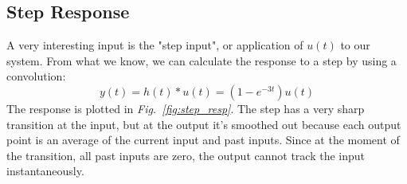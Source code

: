 \subsection{Step Response}
A very interesting input is the "step input", or application of $u(t)$ to our system.  From what we know, we can calculate the response to a step by using a convolution:
    \begin{equation}
        y(t) = h(t) * u(t) = \left( 1 - e^{-3 t} \right) u(t) 
    \end{equation}
The response is plotted in \emph{Fig.~\ref{fig:step_resp}}. The step has a very sharp transition at the input, but at the output it's smoothed out because each output point is an average of the current input and past inputs.  Since at the moment of the transition, all past inputs are zero, the output cannot track the input instantaneously.  
